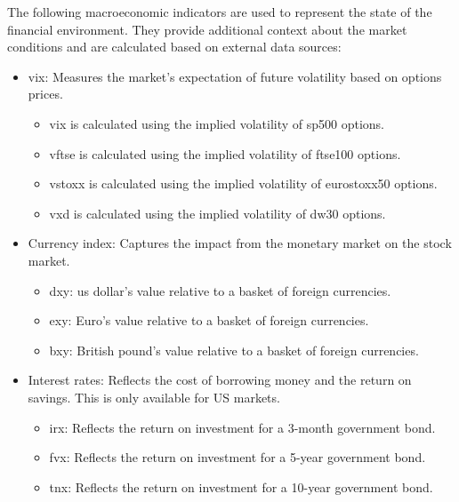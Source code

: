The following macroeconomic indicators are used to represent the state of the financial environment. They provide additional context about the market conditions and are calculated based on external data sources:
\begin{itemize}
    \item \acrfull{vix}: Measures the market's expectation of future volatility based on options prices.
    \begin{itemize}
        \item \acrshort{vix} is calculated using the implied volatility of \acrfull{sp500} options.
        \item \acrshort{vftse} is calculated using the implied volatility of \acrfull{ftse100} options.
        \item \acrshort{vstoxx} is calculated using the implied volatility of \acrlong{eurostoxx50} options.
        \item \acrshort{vxd} is calculated using the implied volatility of \acrfull{dw30} options.
    \end{itemize}
    \item Currency index: Captures the impact from the monetary market on the stock market.
    \begin{itemize}
        \item \acrfull{dxy}: \acrfull{us} dollar's value relative to a basket of foreign currencies.
        \item \acrfull{exy}: Euro's value relative to a basket of foreign currencies.
        \item \acrfull{bxy}: British pound's value relative to a basket of foreign currencies.
    \end{itemize}
    \item Interest rates: Reflects the cost of borrowing money and the return on savings. This is only available for US markets.
    \begin{itemize}
        \item \acrfull{irx}: Reflects the return on investment for a 3-month government bond.
        \item \acrfull{fvx}: Reflects the return on investment for a 5-year government bond.
        \item \acrfull{tnx}: Reflects the return on investment for a 10-year government bond.
    \end{itemize}
\end{itemize}